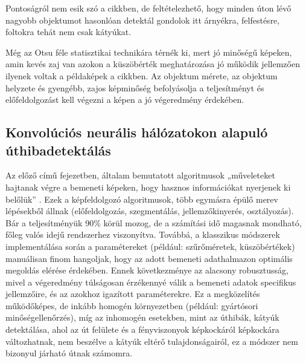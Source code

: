 Pontoságról nem esik szó a cikkben, de feltételezhető, hogy minden úton
lévő nagyobb objektumot hasonlóan detektál gondolok itt árnyékra,
felfestésre, foltokra tehát nem csak kátyúkat.

Még az Otsu féle statisztikai technikára térnék ki, mert jó minőségű
képeken, amin kevés zaj van azokon a küszöbérték meghatározása jó
működik jellemzően ilyenek voltak a példaképek a cikkben. Az objektum
mérete, az objektum helyzete és gyengébb, zajos képminőség befolyásolja
a teljesítményt és előfeldolgozást kell végezni a képen a jó végeredmény
érdekében. \cite{gohPerformanceAnalysisImage2018}
\subsection{Konvolúciós neurális hálózatokon alapuló úthibadetektálás}

Az előző
 című fejezetben,
általam bemutatott algoritmusok „műveleteket hajtanak végre a bemeneti
képeken, hogy hasznos információkat nyerjenek ki belőlük'' \cite{rComprehensiveReviewAsphalt2022}.
Ezek a képfeldolgozó algoritmusok, több egymásra épülő merev lépésekből
állnak (előfeldolgozás, szegmentálás, jellemzőkinyerés, osztályozás).
Bár a teljesítményük 90\% körül mozog, de a számítási idő magasnak
mondható, főleg valós idejű rendszerhez viszonyítva. Továbbá, a
klasszikus módszerek implementálása során a paramétereket (például:
szűrőméretek, küszöbértékek) manuálisan finom hangoljak, hogy az adott
bemeneti adathalmazon optimális megoldás elérése érdekében. Ennek
következménye az alacsony robusztusság, mivel a végeredmény túlságosan
érzékennyé válik a bemeneti adatok specifikus jellemzőire, és az azokhoz
igazított paraméterekre. Ez a megközelítés működőképes, de inkább
homogén környezetben (például: gyártósori minőségellenőrzés), míg az
inhomogén esetekben, mint az úthibák, kátyúk detektálása, ahol az út
felülete és a fényviszonyok képkockáról képkockára változhatnak, nem
beszélve a kátyúk eltérő tulajdonságairól, ez a módszer nem bizonyul
járható útnak számomra.

